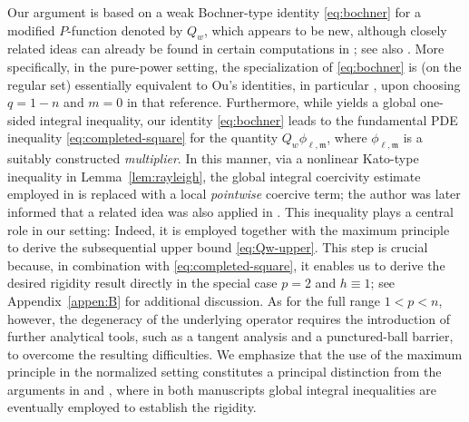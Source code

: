 \documentclass[reqno,12pt]{amsart}
\numberwithin{equation}{section}
\theoremstyle{remark}
\begin{document}
Our argument is based on a weak Bochner-type identity \eqref{eq:bochner} for a modified $P$-function denoted by $Q_w$, which appears to be new, although closely related ideas can already be found in certain computations in \cite{O2025}; see also \cite{MW2024}. More specifically, in the pure-power setting, the specialization of \eqref{eq:bochner} is (on the regular set) essentially equivalent to Ou’s identities, in particular \cite[Lemma 2.2, Formula (2.12)]{O2025}, upon choosing $q=1-n$ and $m=0$ in that reference.
Furthermore, while \cite[Proposition 2.3]{O2025} yields a global one-sided integral inequality, our identity \eqref{eq:bochner} leads to the fundamental PDE inequality \eqref{eq:completed-square} for the quantity $Q_w\phi_{\ell,\mathfrak m}$, where $\phi_{\ell,\mathfrak m}$ is a suitably constructed \emph{multiplier}. In this manner, via a nonlinear Kato-type inequality  in Lemma~\ref{lem:rayleigh}, the global integral coercivity estimate employed in \cite{O2025} is replaced with a local \emph{pointwise} coercive term; the author was later informed that a related idea was also applied in \cite{SW2025}. This inequality plays a central role in our setting: Indeed, it is employed together with the maximum principle to derive the subsequential upper bound \eqref{eq:Qw-upper}. 
This step is crucial because, in combination with \eqref{eq:completed-square}, it enables us to derive the desired rigidity result directly in the special case $p=2$ and $h\equiv 1$; see Appendix~\ref{appen:B} for additional discussion.  As for the full range $1<p<n$, however, the degeneracy of the underlying operator requires the introduction of further analytical tools, such as a tangent analysis and a punctured-ball barrier, to overcome the resulting difficulties. We emphasize that the use of the maximum principle in the normalized setting constitutes a principal distinction from the arguments in \cite{O2025} and \cite{SW2025}, where in both manuscripts global integral inequalities are eventually employed to establish the rigidity.
\end{document}
